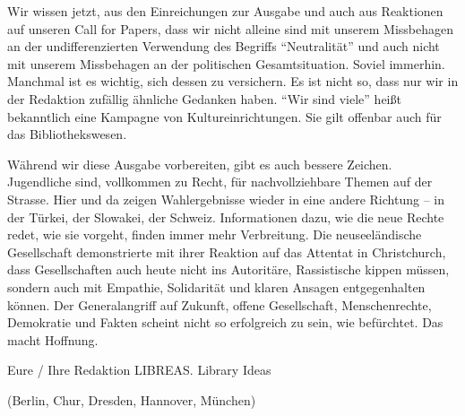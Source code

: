 \documentclass[a4paper,
fontsize=11pt,
oneside,
numbers=noperiodatend,
parskip=half-,
bibliography=totoc,
final
]{scrartcl}
\begin{document}
Wir wissen jetzt, aus den Einreichungen zur Ausgabe und auch aus
Reaktionen auf unseren Call for Papers, dass wir nicht alleine sind mit
unserem Missbehagen an der undifferenzierten Verwendung des Begriffs
\enquote{Neutralität} und auch nicht mit unserem Missbehagen an der
politischen Gesamtsituation. Soviel immerhin. Manchmal ist es wichtig,
sich dessen zu versichern. Es ist nicht so, dass nur wir in der
Redaktion zufällig ähnliche Gedanken haben. \enquote{Wir sind viele}
heißt bekanntlich eine Kampagne von Kultureinrichtungen. Sie gilt
offenbar auch für das Bibliothekswesen.

Während wir diese Ausgabe vorbereiten, gibt es auch bessere Zeichen.
Jugendliche sind, vollkommen zu Recht, für nachvollziehbare Themen auf
der Strasse. Hier und da zeigen Wahlergebnisse wieder in eine andere
Richtung -- in der Türkei, der Slowakei, der Schweiz. Informationen
dazu, wie die neue Rechte redet, wie sie vorgeht, finden immer mehr
Verbreitung. Die neuseeländische Gesellschaft demonstrierte mit ihrer
Reaktion auf das Attentat in Christchurch, dass Gesellschaften auch
heute nicht ins Autoritäre, Rassistische kippen müssen, sondern auch mit
Empathie, Solidarität und klaren Ansagen entgegenhalten können. Der
Generalangriff auf Zukunft, offene Gesellschaft, Menschenrechte,
Demokratie und Fakten scheint nicht so erfolgreich zu sein, wie
befürchtet. Das macht Hoffnung.

Eure / Ihre Redaktion LIBREAS. Library Ideas

(Berlin, Chur, Dresden, Hannover, München)

\end{document}
